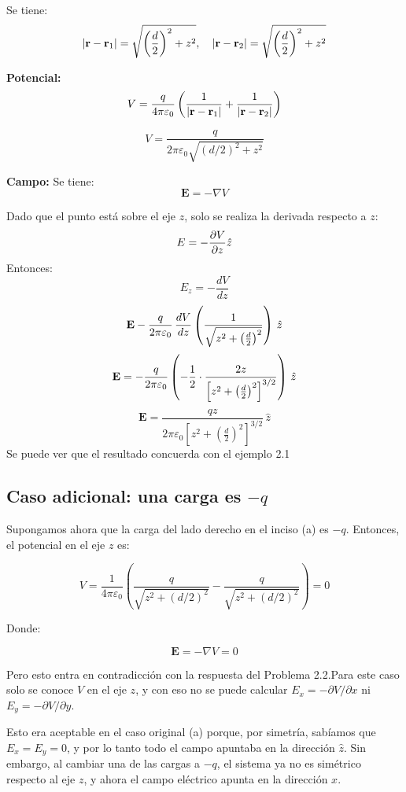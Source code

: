 \documentclass[12pt,letterpaper]{article}
\begin{document}
Se tiene:
\[
\abs{\mathbf{r} - \mathbf{r}_1} = \sqrt{\left(\frac{d}{2}\right)^2 + z^2}, \quad \abs{\mathbf{r} - \mathbf{r}_2} = \sqrt{\left(\frac{d}{2}\right)^2 + z^2}
\]

\textbf{Potencial:}
\[
V = \frac{q}{4\pi\varepsilon_0} \left( \frac{1}{\abs{\mathbf{r} - \mathbf{r}_1}} + \frac{1}{\abs{\mathbf{r} - \mathbf{r}_2}} \right) \]

\[V= \frac{q}{2\pi\varepsilon_0 \sqrt{(d/2)^2 + z^2}}
\]

\textbf{Campo:}
Se tiene:
\[
\mathbf{E} = -\nabla V
\]

Dado que el punto está sobre el eje \(z\), solo se realiza  la derivada respecto a \(z\):
\[
E = -\pdv{V}{z} \hat{z}
\]
Entonces:
\[
E_z = -\frac{dV}{dz} 
\]
\[
\mathbf{E}  -\frac{q}{2\pi \varepsilon_0} \, \frac{dV}{dz}  \left( \frac{1}{\sqrt{z^2 + \left( \frac{d}{2} \right)^2}} \right) \, \hat{z} \\
\]
\[
\mathbf{E} = -\frac{q}{2\pi \varepsilon_0} \left( -\frac{1}{2} \cdot \frac{2z}{\left[ z^2 + \left( \frac{d}{2} \right)^2 \right]^{3/2}} \right) \, \hat{z} \\
\]
\[
\mathbf{E}= \frac{qz}{2\pi \varepsilon_0 \left[ z^2 + \left( \frac{d}{2} \right)^2 \right]^{3/2}} \, \hat{z} 
\]
Se puede ver que el resultado concuerda con el ejemplo 2.1

\subsection*{Caso adicional: una carga es $-q$}


Supongamos ahora que la carga del lado derecho en el inciso (a) es \(-q\). Entonces, el potencial en el eje \(z\) es:

\[
V = \frac{1}{4\pi\varepsilon_0} \left( \frac{q}{\sqrt{z^2 + (d/2)^2}} - \frac{q}{\sqrt{z^2 + (d/2)^2}} \right) = 0
\]

Donde:

\[
\mathbf{E} = -\nabla V = 0
\]

Pero esto entra en contradicción con la respuesta del Problema 2.2.Para este caso solo se conoce  \(V\) en el eje \(z\), y con eso no se puede calcular \(E_x = -\partial V/\partial x\) ni \(E_y = -\partial V/\partial y\).

Esto era aceptable en el caso original (a) porque, por simetría, sabíamos que \(E_x = E_y = 0\), y por lo tanto todo el campo apuntaba en la dirección \(\hat{z}\). Sin embargo, al cambiar una de las cargas a \(-q\), el sistema ya no es simétrico respecto al eje \(z\), y ahora el campo eléctrico apunta en la dirección \(x\).
\end{document}
